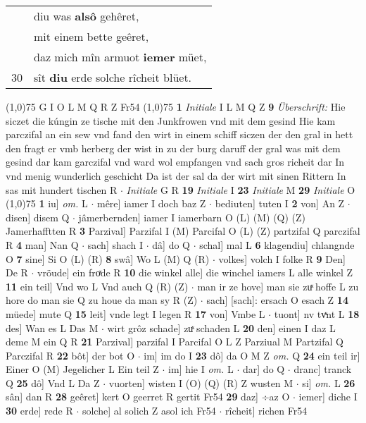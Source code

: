 \documentclass[8pt,a4paper,notitlepage]{article}
\begin{document}
\begin{table}[ht]
\begin{minipage}[t]{0.5\linewidth}
\begin{tabular}{rl}
 & diu was \textbf{alsô} gehêret,\\ 
 & mit einem bette geêret,\\ 
 & daz mich mîn armuot \textbf{iemer} müet,\\ 
30 & sît \textbf{diu} erde solche rîcheit blüet.\\ 
\end{tabular}
\scriptsize
\line(1,0){75} \newline
G I O L M Q R Z Fr54 \newline
\line(1,0){75} \newline
\textbf{1} \textit{Initiale} I L M Q Z  \textbf{9} \textit{Überschrift:} Hie siczet die kúngin ze tische mit den Junkfrowen vnd mit dem gesind Hie kam parczifal an ein sew vnd fand den wirt in einem schiff siczen der den gral in hett den fragt er vmb herberg der wist in zu der burg daruff der gral was mit dem gesind dar kam garczifal vnd ward wol empfangen vnd sach gros richeit dar In vnd menig wunderlich geschicht Da ist der sal da der wirt mit sinen Rittern In sas mit hundert tischen R   $\cdot$ \textit{Initiale} G R  \textbf{19} \textit{Initiale} I  \textbf{23} \textit{Initiale} M  \textbf{29} \textit{Initiale} O  \newline
\line(1,0){75} \newline
\textbf{1} iu] \textit{om.} L  $\cdot$ mêre] iamer I doch baz Z  $\cdot$ bediuten] tuten I \textbf{2} von] An Z  $\cdot$ disen] disem Q  $\cdot$ jâmerbernden] iamer I iamerbarn O (L) (M) (Q) (Z) Jamerhafftten R \textbf{3} Parzival] Parzifal I (M) Parcifal O (L) (Z) partzifal Q parczifal R \textbf{4} man] Nan Q  $\cdot$ sach] shach I  $\cdot$ dâ] do Q  $\cdot$ schal] mal L \textbf{6} klagendiu] chlangnde O \textbf{7} sine] Si O (L) (R) \textbf{8} swâ] Wo L (M) Q (R)  $\cdot$ volkes] volch I folke R \textbf{9} Den] De R  $\cdot$ vröude] ein froͯde R \textbf{10} die winkel alle] die winchel iamers L alle winkel Z \textbf{11} ein teil] Vnd wo L Vnd auch Q (R) (Z)  $\cdot$ man ir ze hove] man sie zuͯ hoffe L zu hore do man sie Q zu houe da man sy R (Z)  $\cdot$ sach] [sach]: ersach O esach Z \textbf{14} müede] mute Q \textbf{15} leit] vnde legt I legen R \textbf{17} von] Vmbe L  $\cdot$ tuont] nv tvͯnt L \textbf{18} des] Wan es L Das M  $\cdot$ wirt grôz schade] zuͯ schaden L \textbf{20} den] einen I daz L deme M ein Q R \textbf{21} Parzival] parzifal I Parcifal O L Z Parziual M Partzifal Q Parczifal R \textbf{22} bôt] der bot O  $\cdot$ im] im do I \textbf{23} dô] da O M Z \textit{om.} Q \textbf{24} ein teil ir] Einer O (M) Jegelicher L Ein teil Z  $\cdot$ im] hie I \textit{om.} L  $\cdot$ dar] do Q  $\cdot$ dranc] tranck Q \textbf{25} dô] Vnd L Da Z  $\cdot$ vuorten] wisten I (O) (Q) (R) Z wusten M  $\cdot$ si] \textit{om.} L \textbf{26} sân] dan R \textbf{28} geêret] kert O geerret R gertit Fr54 \textbf{29} daz] ÷az O  $\cdot$ iemer] diche I \textbf{30} erde] rede R  $\cdot$ solche] al solich Z asol ich Fr54  $\cdot$ rîcheit] richen Fr54 \newline

\end{minipage}
\end{table}
\end{document}

